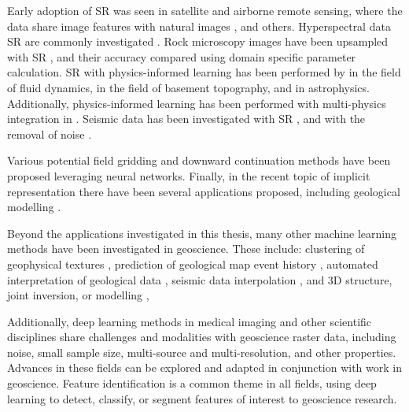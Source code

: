 Early adoption of SR was seen in satellite and airborne remote sensing, where the data share image features with natural images \parencite{lanarasSuperresolutionSentinel2Images2018,arunConvolutionalNetworkArchitectures2019,kawulokTrainingDeepNetworks2019}, and others.
Hyperspectral data SR are commonly investigated \parencite{yangHyperspectralImageClassification2018,arunCNNBasedSuperResolutionHyperspectral2020}.
Rock microscopy images have been upsampled with SR \parencite{niuInnovativeApplicationGenerative2020}, and their accuracy compared using domain specific parameter calculation.
SR with physics-informed learning has been performed by \textcite{bodeUsingPhysicsinformedEnhanced2021,jiangMeshfreeFlowNetPhysicsConstrainedDeep2020} in the field of fluid dynamics, \textcite{leongDeepBedMapDeepNeural2020} in the field of basement topography, and \textcite{jungbluthSingleframeSuperresolutionSolar2019} in astrophysics.
Additionally, physics-informed learning has been performed with multi-physics integration in \textcite{degen3DMultiphysicsUncertainty2022}.
Seismic data has been investigated with SR \parencite{liSuperresolutionSeismicVelocity2021}, and with the removal of noise \parencite{liDeepLearningSimultaneous2021}.

Various potential field gridding \parencite{naprstekApplicationsMachineLearning2019,wangDeepLearningGravity2019a} and downward continuation methods \parencite{liStableDownwardContinuation2023,yeHighprecisionDownwardContinuation2022} have been proposed leveraging neural networks.
Finally, in the recent topic of implicit representation there have been several applications proposed, including geological modelling \parencite{hillierGeoINRImplicitNeural2023}.

Beyond the applications investigated in this thesis, many other machine learning methods have been investigated in geoscience.
These include: clustering of geophysical textures \parencite{grujicGeophysicsNeuralNetworks2019}, prediction of geological map event history \parencite{guo3DGeologicalStructure2021}, automated interpretation of geological data \parencite{waldelandConvolutionalNeuralNetworks2018, babakhinSemisupervisedSegmentationSalt2019,dawsonImpactDatasetSize2023}, seismic data interpolation \parencite{wangDeeplearningbasedSeismicData2018}, and 3D structure, joint inversion, or modelling \parencite{guo3DGeologicalStructure2021,zhihouJointGravityGravity2021},

Additionally, deep learning methods in medical imaging and other scientific disciplines share challenges and modalities with geoscience raster data, including noise, small sample size, multi-source and multi-resolution, and other properties.
Advances in these fields can be explored and adapted in conjunction with work in geoscience.
Feature identification is a common theme in all fields, using deep learning to detect, classify, or segment features of interest to geoscience research.

